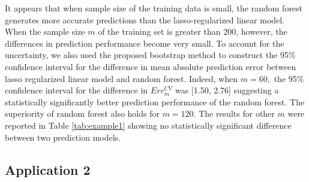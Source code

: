 \documentclass[12pt]{article}
\begin{document}
It appears that when sample size of the training data is small, the random forest generates more accurate predictions than the lasso-regularized linear model. When the sample size $m$ of the training set is greater than 200, however, the differences in prediction performance become very small. To account for the uncertainty, we also used the proposed bootstrap method to construct the 95\% confidence interval for the difference in mean absolute prediction error between lasso regularized linear model and random forest.  Indeed, when $m=60,$ the 95\% confidence interval for the difference in $Err_m^{CV}$ was [1.50, 2.76] suggesting a statistically significantly better prediction performance of the random forest. The superiority of random forest also holds for $m=120.$ The results for other $m$ were reported in Table \ref{tab:example1} showing no statistically significant difference between two prediction models.




\subsection{Application 2}
\end{document}
